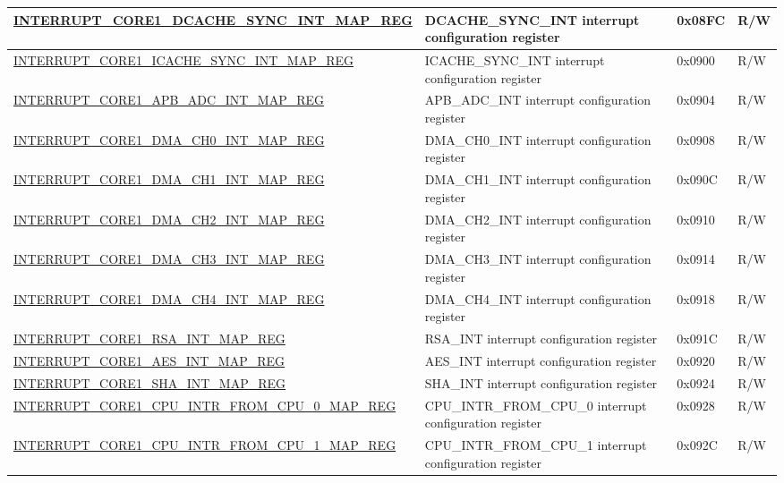 \begin{landscape}
\begin{longtable}{ | p{10cm} | p{10.2cm} | p{1.3cm} | p{1cm} | }
\hyperref[regdesc:INTERRUPTCORE1DCACHESYNCINTMAPREG]{INTERRUPT\_CORE1\_DCACHE\_SYNC\_INT\_MAP\_REG} & DCACHE\_SYNC\_INT interrupt configuration register & 0x08FC & R/W \\ \hline
\hyperref[regdesc:INTERRUPTCORE1ICACHESYNCINTMAPREG]{INTERRUPT\_CORE1\_ICACHE\_SYNC\_INT\_MAP\_REG} & ICACHE\_SYNC\_INT interrupt configuration register & 0x0900 & R/W \\ \hline
\hyperref[regdesc:INTERRUPTCORE1APBADCINTMAPREG]{INTERRUPT\_CORE1\_APB\_ADC\_INT\_MAP\_REG} & APB\_ADC\_INT interrupt configuration register & 0x0904 & R/W \\ \hline
\hyperref[regdesc:INTERRUPTCORE1DMACH0INTMAPREG]{INTERRUPT\_CORE1\_DMA\_CH0\_INT\_MAP\_REG} & DMA\_CH0\_INT interrupt configuration register & 0x0908 & R/W \\ \hline
\hyperref[regdesc:INTERRUPTCORE1DMACH1INTMAPREG]{INTERRUPT\_CORE1\_DMA\_CH1\_INT\_MAP\_REG} & DMA\_CH1\_INT interrupt configuration register & 0x090C & R/W \\ \hline
\hyperref[regdesc:INTERRUPTCORE1DMACH2INTMAPREG]{INTERRUPT\_CORE1\_DMA\_CH2\_INT\_MAP\_REG} & DMA\_CH2\_INT interrupt configuration register & 0x0910 & R/W \\ \hline
\hyperref[regdesc:INTERRUPTCORE1DMACH3INTMAPREG]{INTERRUPT\_CORE1\_DMA\_CH3\_INT\_MAP\_REG} & DMA\_CH3\_INT interrupt configuration register & 0x0914 & R/W \\ \hline
\hyperref[regdesc:INTERRUPTCORE1DMACH4INTMAPREG]{INTERRUPT\_CORE1\_DMA\_CH4\_INT\_MAP\_REG} & DMA\_CH4\_INT interrupt configuration register & 0x0918 & R/W \\ \hline
\hyperref[regdesc:INTERRUPTCORE1RSAINTMAPREG]{INTERRUPT\_CORE1\_RSA\_INT\_MAP\_REG} & RSA\_INT interrupt configuration register & 0x091C & R/W \\ \hline
\hyperref[regdesc:INTERRUPTCORE1AESINTMAPREG]{INTERRUPT\_CORE1\_AES\_INT\_MAP\_REG} & AES\_INT interrupt configuration register & 0x0920 & R/W \\ \hline
\hyperref[regdesc:INTERRUPTCORE1SHAINTMAPREG]{INTERRUPT\_CORE1\_SHA\_INT\_MAP\_REG} & SHA\_INT interrupt configuration register & 0x0924 & R/W \\ \hline
\hyperref[regdesc:INTERRUPTCORE1CPUINTRFROMCPU0MAPREG]{INTERRUPT\_CORE1\_CPU\_INTR\_FROM\_CPU\_0\_MAP\_REG} & CPU\_INTR\_FROM\_CPU\_0 interrupt configuration register & 0x0928 & R/W \\ \hline
\hyperref[regdesc:INTERRUPTCORE1CPUINTRFROMCPU1MAPREG]{INTERRUPT\_CORE1\_CPU\_INTR\_FROM\_CPU\_1\_MAP\_REG} & CPU\_INTR\_FROM\_CPU\_1 interrupt configuration register & 0x092C & R/W \\ \hline

\end{longtable}
\end{landscape}
